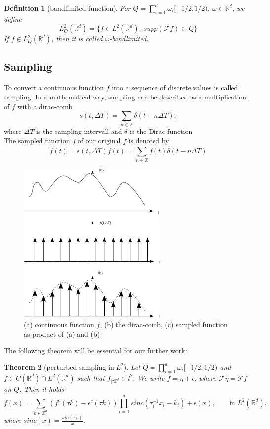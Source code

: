 \documentclass[a4paper, 11pt]{scrreprt}
\newtheorem{defi}{Definition}[section]
\newtheorem{theorem}[defi]{Theorem}
\newcommand{\RR}{\mathbb{R}}
\newcommand{\ZZ}{\mathbb{Z}}
\newcommand{\FF}{\mathcal{F}}
\begin{document}
\begin{defi}[bandlimited function]
	For \(Q = \prod_{i=1}^d \omega_i[-1/2, 1/2),\ \omega\in\RR^d\), we define
	\begin{equation}
		L_Q^2(\RR^d) = \{f\in L^2(\RR^d):\ supp(\FF f) \subset Q\}
	\end{equation}
	If \(f\in L_Q^2(\RR^d)\), then it is called \(\omega\)-bandlimited.
\end{defi}

\subsection{Sampling}
To convert a continuous function \(f\) into a sequence of discrete values is called sampling. In a mathematical way, sampling can be described as a multiplication of \(f\) with a dirac-comb 
\[s(t,\Delta T) = \sum_{n\in\ZZ} \delta(t-n\Delta T), \]
where \(\Delta T\) is the sampling intervall and \(\delta\) is the Dirac-function.\\
The sampled function \(\tilde{f}\) of our original \(f\) is denoted by
\begin{equation}
	\tilde{f} (t) = s(t,\Delta T) f(t) = \sum_{n\in\ZZ} f(t)\delta(t-n\Delta T)
\end{equation}
\begin{figure}[htpb]
	\centering
	\includegraphics[width=0.65\textwidth]{Sampling-Visualisierung.pdf}
	\caption{(a) continuous function \(f\), (b) the dirac-comb, (c) sampled function as product of (a) and (b)}
\end{figure}

The following theorem will be essential for our further work:
\begin{theorem}[perturbed sampling in \(L^2\)]
\label{th:perturbed sampling}
Let \(Q = \prod_{i=1}^d \omega_i[-1/2, 1/2)\) and \\
 \({f\in C(\RR^d)\cap L^2(\RR^d)}\) such that \(f_{|\tau\ZZ^d} \in l^2\). We write \(f=\eta + \epsilon\), where \(\FF\eta = \FF f\) on \(Q\). Then it holds
\begin{equation}
	f(x) = \sum_{k\in\ZZ^d} (f^c(\tau k)-\epsilon^c(\tau k))\prod _{i=1}^d sinc(\tau_i^{-1}x_i-k_i)+\epsilon(x), \qquad \text{in } L^2(\RR^d),
\end{equation}
where \(sinc(x) = \frac{sin(\pi x)}{x}\).
\end{theorem}
\end{document}
